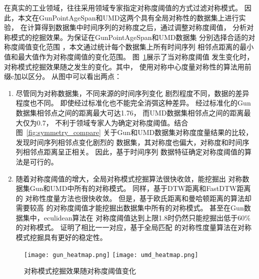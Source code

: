 在真实的工业领域，往往采用领域专家指定对称度阈值的方式过滤对称模式。
因此，本文在GunPointAgeSpan和UMD这两个具有全局对称性的数据集上进行实验，
在计算得到数据集中时间序列的对称度之后，通过调整对称度阈值，
分析对称模式的挖掘效果。为保证在GunPointAgeSpan和UMD数据集
分别选择合适的对称度阈值变化范围
，本文通过统计每个数据集上所有时间序列
相邻点距离的最小值和最大值作为对称度阈值的变化范围。
图~\ref{fig:symmetry_heatmap}展示了当对称度阈值
发生变化时，对称模式挖掘效果随之发生的变化。其中，
使用对称中心度量对称性的算法用前缀c加以区分。
从图中可以看出两点：
\begin{enumerate}
  \item 尽管同为对称数据集，不同来源的时间序列变化
        剧烈程度不同，数据的差异程度也不同。
        即使经过标准化也不能完全消弭这种差异。
        经过标准化的Gun数据集相邻点之间的距离最大可达1.76，
        而UMD数据集相邻点之间的距离最大仅为0.7，
        不利于领域专家人为确定对称度阈值。结合图~\ref{fig:symmetry_compare}
        关于Gun和UMD数据集对称度度量结果的比较，发现时间序列相邻点变化剧烈的
        数据集，其对称度也偏大，对称度和时间序列相邻点距离呈正相关。
        因此，基于时间序列
        数据特征确定对称度阈值的算法是可行的。
  \item 随着对称度阈值的增大，全局对称模式挖掘算法很快收敛，能挖掘出
        对称数据集Gun和UMD中所有的对称模式。
        同样，基于DTW距离和FastDTW距离的
        对称性度量方法也很快收敛。
        但是，基于欧氏距离和曼哈顿距离的算法却需要较高
        的对称度阈值才能挖掘出数据集中所有的对称模式。
        甚至在Gun数据集中，eculidean算法在
        对称度阈值达到上限1.8时仍然只能挖掘出低于60\%的对称模式。
        证明了相比一一对应，基于全局匹配
        的对称性度量算法在对称模式挖掘具有更好的稳定性。

\end{enumerate}
\begin{figure}
  \centering
  {\texttt{[image: gun\_heatmap.png]}}
  {\texttt{[image: umd\_heatmap.png]}}
  \caption{对称模式挖掘效果随对称度阈值变化}
  \label{fig:symmetry_heatmap}
\end{figure}

